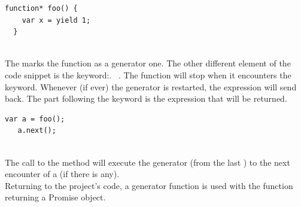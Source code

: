 \documentclass[11pt, a4paper, twoside, openright]{book} %
\begin{document}
\begin{lstlisting}[caption={Structure of a generator function}, captionpos=b]
  function* foo() {
    var x = yield 1;
  }
  \end{lstlisting}
\leavevmode \\
The \say{*} marks the function as a generator one. The other different element of
the code snippet is the keyword:. 
~\cite{yieldExpression}. The function will stop when it encounters the  keyword.
Whenever (if ever) the generator is restarted, the  expression will send  back.
The part following the  keyword is the expression that will be returned.\\

 \begin{lstlisting}[caption={Restart of a generator function}, captionpos=b]
   var a = foo();
   a.next();
 \end{lstlisting}
 \leavevmode \\
The call to the  method will execute the generator (from the last ) to the next encounter of a  (if there is any).\\
Returning to the project's code, a generator function is used with the function returning a Promise object.\\
\end{document}
